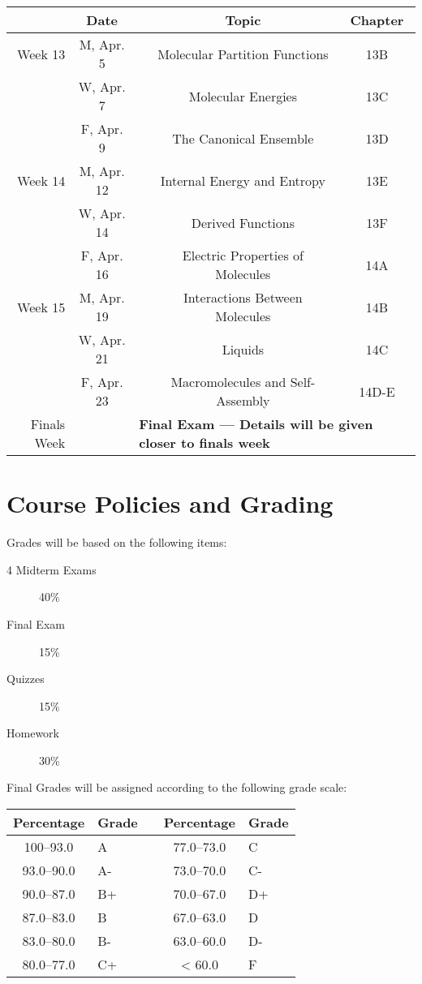 \documentclass[12pt, letterpaper]{article}
\begin{document}
\noindent
\begin{tabular}{rcccc}
	& Date && Topic & Chapter\\
	\midrule
	Week 13 & M, Apr. 5&& Molecular Partition Functions & 13B\\
	& W, Apr. 7&& Molecular Energies & 13C\\
	& F, Apr. 9&& The Canonical Ensemble & 13D\\
	\midrule
	Week 14 & M, Apr. 12&& Internal Energy and Entropy & 13E\\
	& W, Apr. 14&& Derived Functions & 13F\\
	& F, Apr. 16&& Electric Properties of Molecules & 14A\\
	\midrule
	Week 15 & M, Apr. 19&& Interactions Between Molecules & 14B\\
	& W, Apr. 21&& Liquids & 14C\\
	& F, Apr. 23&& Macromolecules and Self-Assembly & 14D-E\\
	\midrule
	Finals Week& & \multicolumn{3}{l}{\textbf{Final Exam --- Details will be given closer to finals week}}\\
\end{tabular}

\section*{Course Policies and Grading}
Grades will be based on the following items:
\begin{description}
  \item[4 Midterm Exams] 40\%
  \item[Final Exam] 15\%
  \item[Quizzes] 15\%
  \item[Homework] 30\%
\end{description}
Final Grades will be assigned according to the following grade scale:

\begin{tabular}{cl|c|cl}
	Percentage & Grade &  & Percentage & Grade \\ \midrule
	100--93.0 & A     &  &  77.0--73.0 & C     \\
	93.0--90.0 & A-    &  &  73.0--70.0 & C-    \\
	90.0--87.0 & B+    &  &  70.0--67.0 & D+    \\
	87.0--83.0 & B     &  &  67.0--63.0 & D     \\
	83.0--80.0 & B-    &  &  63.0--60.0 & D-    \\
	80.0--77.0 & C+    &  &     < 60.0 & F
\end{tabular}
\end{document}
